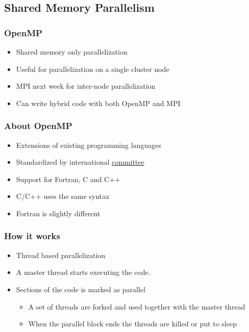 \subsection{Shared Memory
Parallelism}\label{shared-memory-parallelism-1}

\subsubsection{OpenMP}\label{openmp}

\begin{itemize}
\itemsep1pt\parskip0pt
\item
  Shared memory only parallelization
\item
  Useful for parallelization on a single cluster node
\item
  MPI next week for inter-node parallelization
\item
  Can write hybrid code with both OpenMP and MPI
\end{itemize}

\subsubsection{About OpenMP}\label{about-openmp}

\begin{itemize}
\itemsep1pt\parskip0pt
\item
  Extensions of existing programming languages
\item
  Standardized by international \href{http://openmp.org/}{committee}
\item
  Support for Fortran, C and C++
\item
  C/C++ uses the same syntax
\item
  Fortran is slightly different
\end{itemize}

\subsubsection{How it works}\label{how-it-works}

\begin{itemize}
\itemsep1pt\parskip0pt
\item
  Thread based parallelization
\item
  A master thread starts executing the code.
\item
  Sections of the code is marked as parallel

  \begin{itemize}
  \itemsep1pt\parskip0pt
  \item
    A set of threads are forked and used together with the master thread
  \item
    When the parallel block ends the threads are killed or put to sleep
  \end{itemize}
\end{itemize}

